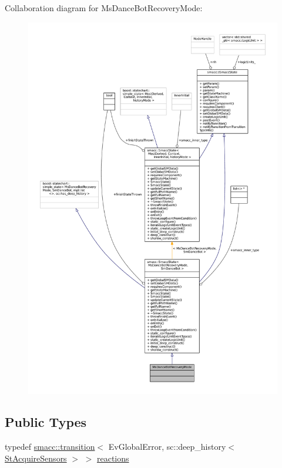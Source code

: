 Collaboration diagram for Ms\+Dance\+Bot\+Recovery\+Mode\+:
\nopagebreak
\begin{figure}[H]
\begin{center}
\leavevmode
\includegraphics[width=350pt]{classMsDanceBotRecoveryMode__coll__graph}
\end{center}
\end{figure}
\subsection*{Public Types}
\begin{DoxyCompactItemize}
\item 
typedef \hyperlink{classsmacc_1_1transition}{smacc\+::transition}$<$ Ev\+Global\+Error, sc\+::deep\+\_\+history$<$ \hyperlink{structStAcquireSensors}{St\+Acquire\+Sensors} $>$ $>$ \hyperlink{classMsDanceBotRecoveryMode_a0b9b9dd300d70cafd84b25b485370b78}{reactions}
\end{DoxyCompactItemize}
